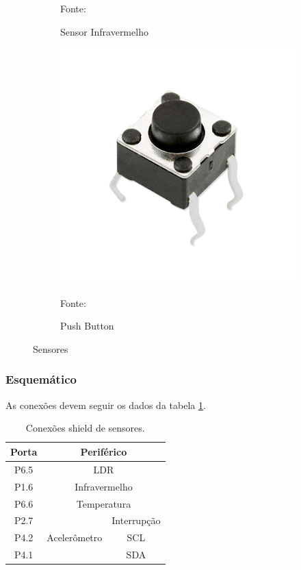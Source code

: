 \begin{figure}[h!]
\begin{subfigure}[b]{0.3\textwidth}
    \caption{Sensor Infravermelho} Fonte: \cite{FilipeFlop2019e}
    \label{fig:infra}
  \end{subfigure}
  \begin{subfigure}[b]{0.3\textwidth}
  \centering
    \includegraphics[width=\textwidth]{figuras/button.jpg}
    \caption{Push Button} Fonte: \cite{FilipeFlop2019f}
    \label{fig:button}
  \end{subfigure}
  \caption{Sensores}
\end{figure}

\subsubsection{Esquemático}

As conexões devem seguir os dados da tabela \ref{tab:sensores}.

\begin{table}[h!]
\centering
\begin{tabular}{|c|c|c|}
\hline
Porta & \multicolumn{2}{c|}{Periférico}              \\ \hline
P6.5  & \multicolumn{2}{c|}{LDR}                     \\ \hline
P1.6  & \multicolumn{2}{c|}{Infravermelho}           \\ \hline
P6.6  & \multicolumn{2}{c|}{Temperatura}             \\ \hline
P2.7  & \multirow{3}{*}{Acelerômetro} & Interrupção \\ \cline{1-1} \cline{3-3} 
P4.2  &                               & SCL          \\ \cline{1-1} \cline{3-3} 
P4.1  &                               & SDA          \\ \hline
\end{tabular}
\caption{Conexões shield de sensores.}
\label{tab:sensores}
\end{table}

